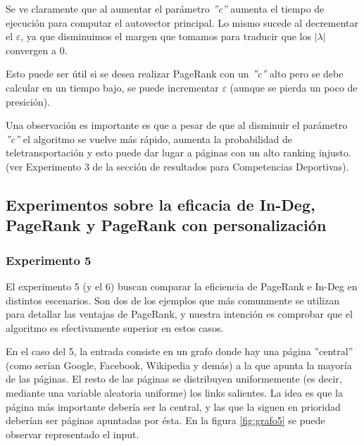 \par Se ve claramente que al aumentar el par\'ametro \textit{''c''} aumenta el tiempo de ejecución para computar el autovector principal. Lo mismo sucede al decrementar el $\varepsilon$, ya que disminuimos el margen que tomamos para traducir que los $|\lambda|$ convergen a 0.
\par Esto puede ser \'util si se desea realizar PageRank con un \textit{''c''} alto pero se debe calcular en un tiempo bajo, se puede incrementar $\varepsilon$ (aunque se pierda un poco de presici\'on).
\par Una observación es importante es que a pesar de que al disminuir el par\'ametro \textit{''c''} el algoritmo se vuelve más rápido, aumenta la probabilidad de teletransportación y esto puede dar lugar a páginas con un alto ranking injusto. (ver Experimento 3 de la sección de resultados para Competencias Deportivas).

\subsection{Experimentos sobre la eficacia de In-Deg, PageRank y PageRank con personalizaci\'on}
\subsubsection{Experimento 5}
\par El experimento 5 (y el 6) buscan comparar la eficiencia de PageRank e In-Deg en distintos escenarios.
Son dos de los ejemplos que m\'as comunmente se utilizan para detallar las ventajas de PageRank, y nuestra intenci\'on es comprobar que el algoritmo es efectivamente superior en estos casos.
\par En el caso del 5, la entrada consiste en un grafo donde hay una p\'agina ''central'' (como ser\'ian Google, Facebook, Wikipedia y dem\'as) a la que apunta la mayor\'ia de las p\'aginas.
El resto de las p\'aginas se distribuyen uniformemente (es decir, mediante una variable aleatoria uniforme) los links salientes.
La idea es que la p\'agina m\'as importante deber\'ia ser la central, y las que la siguen en prioridad deber\'ian ser p\'aginas apuntadas por \'esta.
En la figura \ref{fig:grafo5} se puede observar representado el input.

